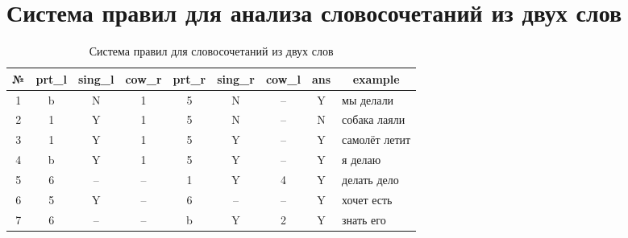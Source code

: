 \documentclass[main]{subfiles}
\begin{document}
\section{Система правил для анализа словосочетаний из двух слов}\label{app:A}
\begin{table}[!h]
	\begin{center}
		\captionsetup{format=hang,labelsep = endash, singlelinecheck=false}
	\caption{Система правил для словосочетаний из двух слов}
		\begin{tabular}{|c|c|c|c|c|c|c|c|l|}
			\hline
			\textbf{№} & \textbf{prt\_l} &\textbf{ sing\_l}  & \textbf{cow\_r} & \textbf{prt\_r }& \textbf{sing\_r} & \textbf{cow\_l} & \textbf{ans}  & \multicolumn{1}{c|}{\textbf{example}} \\ \hline
			1 & b & N & 1 & 5 & N & --  & Y  & мы делали \\ \hline
			2 &  1 &Y & 1 & 5 & N & -- & N & собака лаяли\\ \hline
			3 & 1 & Y & 1 & 5 & Y & -- & Y & самолёт летит\\ \hline 
			4 & b & Y & 1 & 5 & Y & -- & Y & я делаю \\ \hline
			5&6&--&--&1&Y&4&Y&делать дело\\ \hline
			6&5&Y&--&6&--&--&Y&хочет есть\\ \hline
			7&6&--&--&b&Y&2&Y&знать его\\ \hline
		\end{tabular}
	\end{center}
\end{table}
\end{document}
